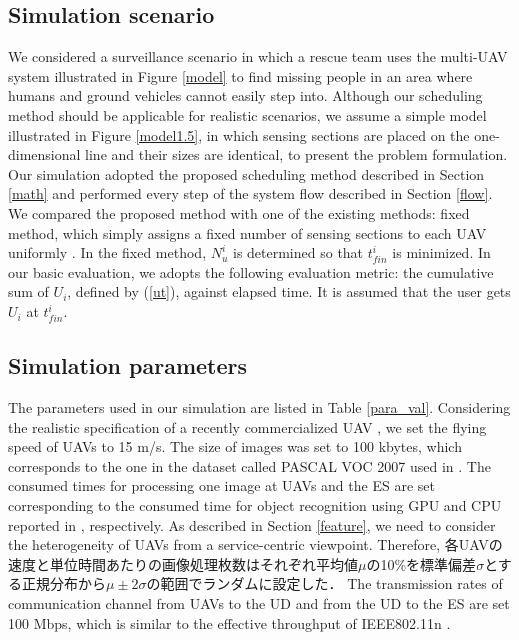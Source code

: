 \documentclass{ieeeaccess}
\begin{document}
\subsection{Simulation scenario}
We considered a surveillance scenario in which a rescue team uses the multi-UAV system illustrated in Figure \ref{model} to find missing people in an area where humans and ground vehicles cannot easily step into.
%
Although our scheduling method should be applicable for realistic scenarios, we assume a simple model illustrated in Figure \ref{model1.5}, in which sensing sections are placed on the one-dimensional line and their sizes are identical, to present the problem formulation.
%
Our simulation adopted the proposed scheduling method described in Section \ref{math} and performed every step of the system flow described in Section \ref{flow}.
%
We compared the proposed method with one of the existing methods: fixed method, which simply assigns a fixed number of sensing sections to each UAV uniformly \cite{chang2016}.
In the fixed method, $N_u^i$ is determined so that $t_{fin}^i$ is minimized.
%
In our basic evaluation, we adopts the following evaluation metric: the cumulative sum of $U_i$, defined by (\ref{ut}), against elapsed time.
It is assumed that the user gets $U_i$ at $t_{fin}^i$.

\subsection{Simulation parameters}

The parameters used in our simulation are listed in Table \ref{para_val}.
%
Considering the realistic specification of a recently commercialized UAV \cite{bebop2}, we set the flying speed of UAVs to 15 m/s.
%
The size of images was set to 100 kbytes, which corresponds to the one in the dataset called PASCAL VOC 2007 used in \cite{Ren2015}.
%
The consumed times for processing one image at UAVs and the ES are set corresponding to the consumed time for object recognition using GPU and CPU reported in \cite{Ren2015}, respectively.
As described in Section \ref{feature}, we need to consider the heterogeneity of UAVs from a service-centric viewpoint.
Therefore, 各UAVの速度と単位時間あたりの画像処理枚数はそれぞれ平均値$\mu$の10\%を標準偏差$\sigma$とする正規分布から$\mu{\pm}2{\sigma}$の範囲でランダムに設定した．
%
The transmission rates of communication channel from UAVs to the UD and from the UD to the ES are set 100 Mbps, which is similar to the effective throughput of IEEE802.11n \cite{Li2013}.
%
\end{document}
